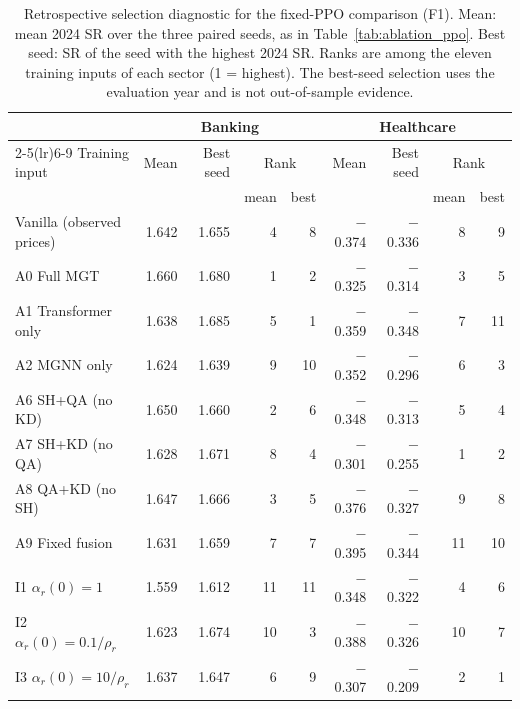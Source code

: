 \begin{table}[!h]\centering\small\color{blue}
\caption{Retrospective selection diagnostic for the fixed-PPO comparison (F1). Mean: mean 2024 SR over the three paired seeds, as in Table~\ref{tab:ablation_ppo}. Best seed: SR of the seed with the highest 2024 SR. Ranks are among the eleven training inputs of each sector (1 = highest). The best-seed selection uses the evaluation year and is not out-of-sample evidence.}
\label{tab:retro}
\setlength{\tabcolsep}{3.5pt}
\begin{tabular}{lrrrrrrrr}\toprule
 & \multicolumn{4}{c}{Banking} & \multicolumn{4}{c}{Healthcare} \\ \cmidrule(lr){2-5}\cmidrule(lr){6-9}
Training input & Mean & Best seed & \multicolumn{2}{c}{Rank} & Mean & Best seed & \multicolumn{2}{c}{Rank} \\
 & & & mean & best & & & mean & best \\ \midrule
Vanilla (observed prices) & 1.642 & 1.655 & 4 & 8 & $-$0.374 & $-$0.336 & 8 & 9 \\
A0 Full MGT & 1.660 & 1.680 & 1 & 2 & $-$0.325 & $-$0.314 & 3 & 5 \\
A1 Transformer only & 1.638 & 1.685 & 5 & 1 & $-$0.359 & $-$0.348 & 7 & 11 \\
A2 MGNN only & 1.624 & 1.639 & 9 & 10 & $-$0.352 & $-$0.296 & 6 & 3 \\
A6 SH+QA (no KD) & 1.650 & 1.660 & 2 & 6 & $-$0.348 & $-$0.313 & 5 & 4 \\
A7 SH+KD (no QA) & 1.628 & 1.671 & 8 & 4 & $-$0.301 & $-$0.255 & 1 & 2 \\
A8 QA+KD (no SH) & 1.647 & 1.666 & 3 & 5 & $-$0.376 & $-$0.327 & 9 & 8 \\
A9 Fixed fusion & 1.631 & 1.659 & 7 & 7 & $-$0.395 & $-$0.344 & 11 & 10 \\
I1 $\alpha_r(0)=1$ & 1.559 & 1.612 & 11 & 11 & $-$0.348 & $-$0.322 & 4 & 6 \\
I2 $\alpha_r(0)=0.1/\rho_r$ & 1.623 & 1.674 & 10 & 3 & $-$0.388 & $-$0.326 & 10 & 7 \\
I3 $\alpha_r(0)=10/\rho_r$ & 1.637 & 1.647 & 6 & 9 & $-$0.307 & $-$0.209 & 2 & 1 \\
\bottomrule
\end{tabular}\end{table}
